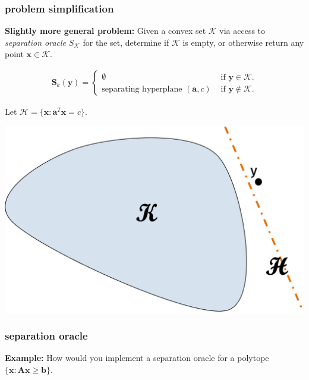 \documentclass[compress]{beamer}
\newcommand{\bv}[1]{\mathbf{#1}}
\begin{document}
\begin{frame}[t]
	\frametitle{problem simplification}
	\small
		\textbf{Slightly more general problem:}
		Given a convex set $\mathcal{K}$ via access to \emph{separation oracle} $S_\mathcal{K}$ for the set, determine if $\mathcal{K}$ is empty, or otherwise return any point $\bv{x}\in \mathcal{K}$. 
		\vspace{-2em}
		
		\begin{align*}
			\bv{S}_k(\bv{y}) = \begin{cases}
				\emptyset &\text{ if } \bv{y} \in \mathcal{K}. \\
				\text{separating hyperplane } (\bv{a},c) &\text{ if } \bv{y} \notin \mathcal{K}.
			\end{cases}
		\end{align*}
	
	Let $\mathcal{H} = \{\bv{x}: \bv{a}^T\bv{x} = c\}$.
	\vspace{-1em}
		\begin{center}
			\includegraphics[width=.65\textwidth]{seperationoracle.png}
		\end{center}
	
\end{frame}

\begin{frame}[t]
	\frametitle{separation oracle}
	\textbf{Example:} How would you implement a separation oracle for a polytope $\{\bv{x}: \bv{A}\bv{x} \geq \bv{b}\}$. 
\end{frame}
\end{document}
